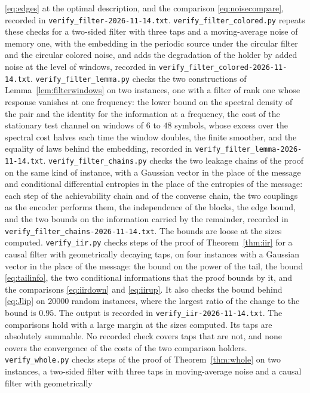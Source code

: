 \documentclass[11pt,onecolumn]{IEEEtran}
\begin{document}
\eqref{eq:edges} at the optimal description, and the comparison
\eqref{eq:noisecompare}, recorded in
\texttt{verify\_filter-2026-11-14.txt}.
\texttt{verify\_filter\_colored.py} repeats these checks for a
two-sided filter with three taps and a moving-average noise of memory
one, with the embedding in the periodic source under the circular
filter and the circular colored noise, and adds the degradation of the
holder by added noise at the level of windows, recorded in
\texttt{verify\_filter\_colored-2026-11-14.txt}.
\texttt{verify\_filter\_lemma.py} checks the two constructions of
Lemma~\ref{lem:filterwindows} on two instances, one with a filter of
rank one whose response vanishes at one frequency: the lower bound on
the spectral density of the pair and the identity for the information
at a frequency, the cost of the stationary test channel on windows of
$6$ to $48$ symbols, whose excess over the spectral cost halves each
time the window doubles, the finite smoother, and the equality of laws
behind the embedding, recorded in
\texttt{verify\_filter\_lemma-2026-11-14.txt}.
\texttt{verify\_filter\_chains.py} checks the two leakage chains of the
proof on the same kind of instance, with a Gaussian vector in the place
of the message and conditional differential entropies in the place of
the entropies of the message: each step of the achievability chain and
of the converse chain, the two couplings as the encoder performs them,
the independence of the blocks, the edge bound, and the two bounds on
the information carried by the remainder, recorded in
\texttt{verify\_filter\_chains-2026-11-14.txt}. The bounds are loose at
the sizes computed.
\texttt{verify\_iir.py} checks steps of the proof of
Theorem~\ref{thm:iir} for a causal filter with geometrically decaying
taps, on four instances with a Gaussian vector in the place of the
message: the bound on the power of the tail, the bound
\eqref{eq:tailinfo}, the two conditional informations that the proof
bounds by it, and the comparisons \eqref{eq:iirdown} and
\eqref{eq:iirup}. It also checks the bound behind \eqref{eq:Jlip} on
$20000$ random instances, where the largest ratio of the change to the
bound is $0.95$. The output is recorded in
\texttt{verify\_iir-2026-11-14.txt}. The comparisons hold with a large
margin at the sizes computed. Its taps are absolutely summable. No recorded check covers
taps that are not, and none covers the convergence of the costs of the
two comparison holders.
\texttt{verify\_whole.py} checks steps of the proof of
Theorem~\ref{thm:whole} on two instances, a two-sided filter with three
taps in moving-average noise and a causal filter with geometrically
\end{document}
